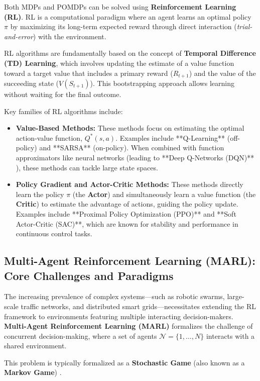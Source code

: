 \documentclass[conference]{IEEEtran}
\begin{document}
Both MDPs and POMDPs can be solved using \textbf{Reinforcement Learning (RL)}. RL is a computational paradigm where an agent learns an optimal policy $\pi$ by maximizing its long-term expected reward through direct interaction (\textit{trial-and-error}) with the environment.

RL algorithms are fundamentally based on the concept of \textbf{Temporal Difference (TD) Learning}, which involves updating the estimate of a value function toward a target value that includes a primary reward ($R_{t+1}$) and the value of the succeeding state ($V(S_{t+1})$). This bootstrapping approach allows learning without waiting for the final outcome.

Key families of RL algorithms include:
\begin{itemize}
    \item \textbf{Value-Based Methods:} These methods focus on estimating the optimal action-value function, $Q^*(s, a)$. Examples include **Q-Learning** (off-policy) and **SARSA** (on-policy). When combined with function approximators like neural networks (leading to **Deep Q-Networks (DQN)** \cite{mnihHumanlevelControlDeep2015}), these methods can tackle large state spaces.
    \item \textbf{Policy Gradient and Actor-Critic Methods:} These methods directly learn the policy $\pi$ (the \textbf{Actor}) and simultaneously learn a value function (the \textbf{Critic}) to estimate the advantage of actions, guiding the policy update. Examples include **Proximal Policy Optimization (PPO)** and **Soft Actor-Critic (SAC)**, which are known for stability and performance in continuous control tasks.
\end{itemize}

\subsection{Multi-Agent Reinforcement Learning (MARL): Core Challenges and Paradigms}

The increasing prevalence of complex systems—such as robotic swarms, large-scale traffic networks, and distributed smart grids—necessitates extending the RL framework to environments featuring multiple interacting decision-makers. \textbf{Multi-Agent Reinforcement Learning (MARL)} formalizes the challenge of concurrent decision-making, where a set of agents $\mathcal{N} = \{1, \ldots, N\}$ interacts with a shared environment.

This problem is typically formalized as a \textbf{Stochastic Game} (also known as a \textbf{Markov Game}) \cite{littmanMarkovGamesFramework1994}.
\end{document}
